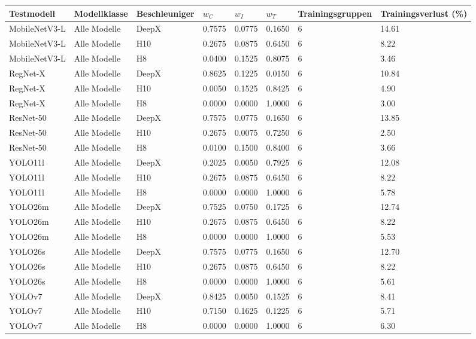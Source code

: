 \begin{tabular}{@{}llllllll@{}}
\toprule
Testmodell & Modellklasse & Beschleuniger & $w_C$ & $w_I$ & $w_T$ & Trainingsgruppen & Trainingsverlust (\%) \\
\midrule
MobileNetV3-L & Alle Modelle & DeepX & 0.7575 & 0.0775 & 0.1650 & 6 & 14.61 \\
MobileNetV3-L & Alle Modelle & H10 & 0.2675 & 0.0875 & 0.6450 & 6 & 8.22 \\
MobileNetV3-L & Alle Modelle & H8 & 0.0400 & 0.1525 & 0.8075 & 6 & 3.46 \\
RegNet-X & Alle Modelle & DeepX & 0.8625 & 0.1225 & 0.0150 & 6 & 10.84 \\
RegNet-X & Alle Modelle & H10 & 0.0050 & 0.1525 & 0.8425 & 6 & 4.90 \\
RegNet-X & Alle Modelle & H8 & 0.0000 & 0.0000 & 1.0000 & 6 & 3.00 \\
ResNet-50 & Alle Modelle & DeepX & 0.7575 & 0.0775 & 0.1650 & 6 & 13.85 \\
ResNet-50 & Alle Modelle & H10 & 0.2675 & 0.0075 & 0.7250 & 6 & 2.50 \\
ResNet-50 & Alle Modelle & H8 & 0.0100 & 0.1500 & 0.8400 & 6 & 3.66 \\
YOLO11l & Alle Modelle & DeepX & 0.2025 & 0.0050 & 0.7925 & 6 & 12.08 \\
YOLO11l & Alle Modelle & H10 & 0.2675 & 0.0875 & 0.6450 & 6 & 8.22 \\
YOLO11l & Alle Modelle & H8 & 0.0000 & 0.0000 & 1.0000 & 6 & 5.78 \\
YOLO26m & Alle Modelle & DeepX & 0.7525 & 0.0750 & 0.1725 & 6 & 12.74 \\
YOLO26m & Alle Modelle & H10 & 0.2675 & 0.0875 & 0.6450 & 6 & 8.22 \\
YOLO26m & Alle Modelle & H8 & 0.0000 & 0.0000 & 1.0000 & 6 & 5.53 \\
YOLO26s & Alle Modelle & DeepX & 0.7575 & 0.0775 & 0.1650 & 6 & 12.70 \\
YOLO26s & Alle Modelle & H10 & 0.2675 & 0.0875 & 0.6450 & 6 & 8.22 \\
YOLO26s & Alle Modelle & H8 & 0.0000 & 0.0000 & 1.0000 & 6 & 5.61 \\
YOLOv7 & Alle Modelle & DeepX & 0.8425 & 0.0050 & 0.1525 & 6 & 8.41 \\
YOLOv7 & Alle Modelle & H10 & 0.7150 & 0.1625 & 0.1225 & 6 & 5.71 \\
YOLOv7 & Alle Modelle & H8 & 0.0000 & 0.0000 & 1.0000 & 6 & 6.30 \\
\bottomrule
\end{tabular}
